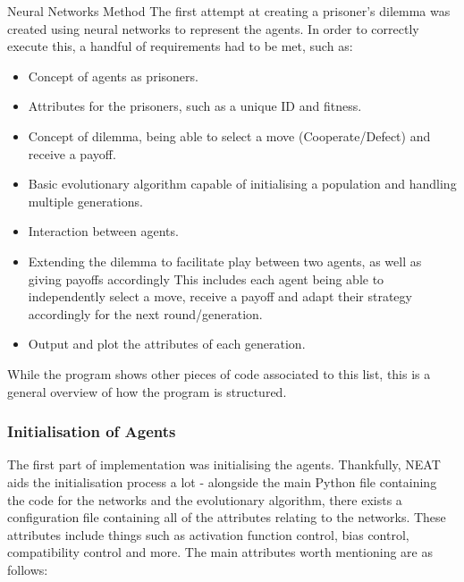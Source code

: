 \documentclass[12pt,a4paper]{article}
\makeatletter
\renewcommand\subsection{\@startsection {subsection}{1}{2mm}
                               {3pt plus 2pt minus 1pt}
                               {3pt plus 0pt}
                               {\normalfont\bfseries}}
\makeatother
\begin{document}
\subsection{Neural Networks Method}
The first attempt at creating a prisoner's dilemma was created using neural networks to represent the agents. In order to correctly execute this, a handful of requirements had to be met, such as: \\

\begin{itemize}
  \item Concept of agents as prisoners.
  \item Attributes for the prisoners, such as a unique ID and fitness.
  \item Concept of dilemma, being able to select a move (Cooperate/Defect) and receive a payoff.
  \item Basic evolutionary algorithm capable of initialising a population and handling multiple generations.
  \item Interaction between agents.
  \item Extending the dilemma to facilitate play between two agents, as well as giving payoffs accordingly This includes each agent being able to independently select a move, receive a payoff
	and adapt their strategy accordingly for the next round/generation.
  \item Output and plot the attributes of each generation. \\
\end{itemize}

While the program shows other pieces of code associated to this list, this is a general overview of how the program is structured. \\

\subsubsection{Initialisation of Agents}
The first part of implementation was initialising the agents. Thankfully, NEAT aids the initialisation process a lot - alongside the main Python file containing the code for the networks and the evolutionary algorithm, there exists a configuration file containing all of the attributes relating to the networks. These attributes include things such as activation function control, bias control, compatibility control and more. The main attributes worth mentioning are as follows: \\
\end{document}
